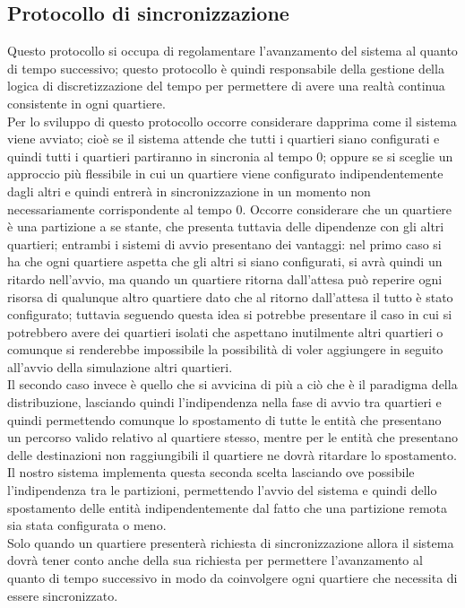 \subsection{Protocollo di sincronizzazione}
\label{protosynch}
Questo protocollo si occupa di regolamentare l'avanzamento del sistema al quanto di tempo successivo; questo protocollo è quindi responsabile della gestione della logica di discretizzazione del tempo per permettere di avere una realtà continua consistente in ogni quartiere.\\
Per lo sviluppo di questo protocollo occorre considerare dapprima come il sistema viene avviato; cioè se il sistema attende che tutti i quartieri siano configurati e quindi tutti i quartieri partiranno in sincronia al tempo 0; oppure se si sceglie un approccio più flessibile in cui un quartiere viene configurato indipendentemente dagli altri e quindi entrerà in sincronizzazione in un momento non necessariamente corrispondente al tempo 0. Occorre considerare che un quartiere è una partizione a se stante, che presenta tuttavia delle dipendenze con gli altri quartieri; entrambi i sistemi di avvio presentano dei vantaggi: nel primo caso si ha che ogni quartiere aspetta che gli altri si siano configurati, si avrà quindi un ritardo nell'avvio, ma quando un quartiere ritorna dall'attesa può reperire ogni risorsa di qualunque altro quartiere dato che al ritorno dall'attesa il tutto è stato configurato; tuttavia seguendo questa idea si potrebbe presentare il caso in cui si potrebbero avere dei quartieri isolati che aspettano inutilmente altri quartieri o comunque si renderebbe impossibile la possibilità di voler aggiungere in seguito all'avvio della simulazione altri quartieri.\\
Il secondo caso invece è quello che si avvicina di più a ciò che è il paradigma della distribuzione, lasciando quindi l'indipendenza nella fase di avvio tra quartieri e quindi permettendo comunque lo spostamento di tutte le entità che presentano un percorso valido relativo al quartiere stesso, mentre per le entità che presentano delle destinazioni non raggiungibili il quartiere ne dovrà ritardare lo spostamento. Il nostro sistema implementa questa seconda scelta lasciando ove possibile l'indipendenza tra le partizioni, permettendo l'avvio del sistema e quindi dello spostamento delle entità indipendentemente dal fatto che una partizione remota sia stata configurata o meno.\\
Solo quando un quartiere presenterà richiesta di sincronizzazione allora il sistema dovrà tener conto anche della sua richiesta per permettere l'avanzamento al quanto di tempo successivo in modo da coinvolgere ogni quartiere che necessita di essere sincronizzato.\\
